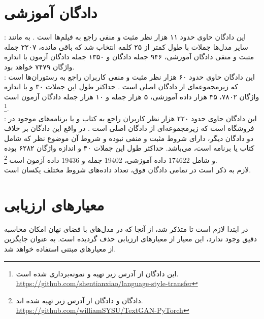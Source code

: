 \section{دادگان آموزشی} \label{chap4:dataset}
:
این دادگان حاوی حدود ۱۱ هزار نظر مثبت و منفی راجع به فیلم‌ها است \cite{sst}. به مانند سایر مدل‌ها جملات با طول کمتر از ۲۵ کلمه انتخاب شد که باقی مانده، ۲۲۰۷ جمله مثبت و منفی دادگان آموزشی، ۹۴۶ جمله دادگان \validation{} و ۱۳۵۰ جمله دادگان آزمون با اندازه واژگان ۷۴۷۹ خواهد بود.
\\
:
این دادگان حاوی حدود ۶۰ هزار نظر مثبت و منفی کاربران راجع به رستوران‌ها است که زیرمجموعه‌ای از دادگان اصلی است
.
حداکثر طول این جملات ۳۰ و با اندازه واژگان ۷۸۰۲، ۴۵ هزار داده آموزشی، ۵ هزار جمله \validation{} و ۱۰ هزار جمله دادگان آزمون است
\footnote{
	این دادگان از آدرس زیر تهیه و نمونه‌برداری شده است.
	\\
	\url{https://github.com/shentianxiao/language-style-transfer}}.
\\
:
این دادگان حاوی حدود ۲۲۰ هزار نظر کاربران راجع به کتاب و یا برنامه‌های موجود در فروشگاه  است که زیرمجموعه‌ای از دادگان اصلی است \cite{amazon_review}. در واقع این دادگان بر خلاف دو دادگان دیگر، دارای شروط مثبت و منفی نبوده و شروط آن موضوع نظر که شامل کتاب یا برنامه است، می‌باشد. حداکثر طول این جملات ۴۰ و اندازه واژگان ۶۲۸۲ بوده و شامل 174622 داده آموزشی، 19402 جمله \validation{} و 19436 داده آزمون است
\footnote{
	دادگان \amazon{} و دادگان \sst{} از آدرس زیر تهیه شده اند.
	\\
	\url{https://github.com/williamSYSU/TextGAN-PyTorch}}.
\\
لازم به ذکر است در تمامی دادگان فوق، تعداد داده‌های شروط مختلف یکسان است.
\section{معیارهای ارزیابی} \label{chap4:metrics}
در ابتدا لازم است تا متذکر شد، از آنجا که در مدل‌های با فضای نهان امکان محاسبه دقیق \likelihood{} وجود ندارد، این معیار از معیارهای ارزیابی حذف گردیده است. به عنوان جایگزین از معیار‌های مبتنی \ngramphrase{} استفاده خواهد شد.
